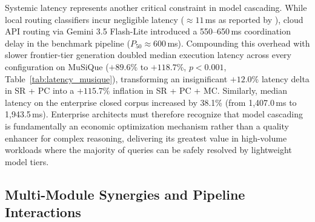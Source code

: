 Systemic latency represents another critical constraint in model cascading. While local routing classifiers incur negligible latency ($\approx 11$\,ms as reported by \citet{zhang2025ragrouter}), cloud API routing via Gemini 3.5 Flash-Lite introduced a 550--650\,ms coordination delay in the benchmark pipeline ($P_{50} \approx 600$\,ms). Compounding this overhead with slower frontier-tier generation doubled median execution latency across every configuration on MuSiQue ($+89.6\%$ to $+118.7\%$, $p < 0.001$, Table~\ref{tab:latency_musique}), transforming an insignificant $+12.0\%$ latency delta in SR + PC into a $+115.7\%$ inflation in SR + PC + MC. Similarly, median latency on the enterprise closed corpus increased by 38.1\% (from 1,407.0\,ms to 1,943.5\,ms). Enterprise architects must therefore recognize that model cascading is fundamentally an economic optimization mechanism rather than a quality enhancer for complex reasoning, delivering its greatest value in high-volume workloads where the majority of queries can be safely resolved by lightweight model tiers.

\subsection{Multi-Module Synergies and Pipeline Interactions}
\label{subsec:disc_synergy_bifurcation}

